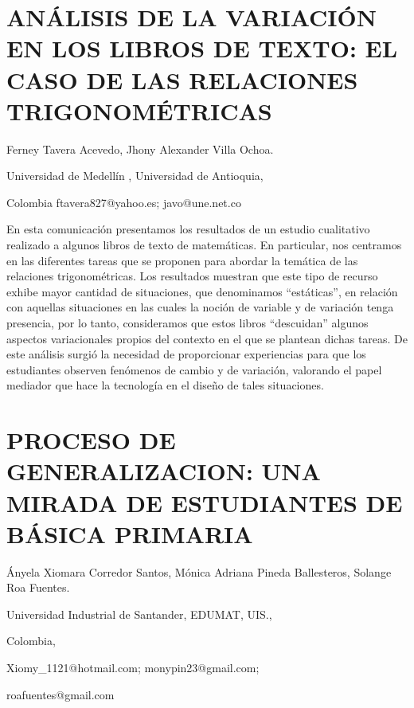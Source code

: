 \setcounter{section}{109}


\section{ANÁLISIS DE LA VARIACIÓN EN LOS LIBROS DE TEXTO: EL CASO DE LAS RELACIONES
TRIGONOMÉTRICAS }

\begin{datos}

Ferney Tavera Acevedo, Jhony Alexander Villa Ochoa.

Universidad de Medellín , Universidad de Antioquia,

Colombia ftavera827@yahoo.es; javo@une.net.co

\end{datos}

En esta comunicación presentamos los resultados de un estudio cualitativo
realizado a algunos libros de texto de matemáticas. En particular,
nos centramos en las diferentes tareas que se proponen para abordar
la temática de las relaciones trigonométricas. Los resultados muestran
que este tipo de recurso exhibe mayor cantidad de situaciones, que
denominamos “estáticas”, en relación con aquellas situaciones en las
cuales la noción de variable y de variación tenga presencia, por lo
tanto, consideramos que estos libros “descuidan” algunos aspectos
variacionales propios del contexto en el que se plantean dichas tareas.
De este análisis surgió la necesidad de proporcionar experiencias
para que los estudiantes observen fenómenos de cambio y de variación,
valorando el papel mediador que hace la tecnología en el diseño de
tales situaciones.


\section{PROCESO DE GENERALIZACION: UNA MIRADA DE ESTUDIANTES DE BÁSICA PRIMARIA}

\begin{datos}

Ányela Xiomara Corredor Santos, Mónica Adriana Pineda Ballesteros,
Solange Roa Fuentes.

Universidad Industrial de Santander, EDUMAT, UIS.,

Colombia,

Xiomy\_1121@hotmail.com; monypin23@gmail.com;

roafuentes@gmail.com

\end{datos}

